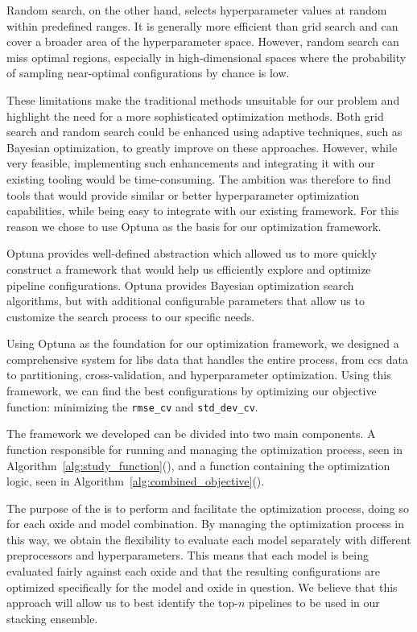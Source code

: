 Random search, on the other hand, selects hyperparameter values at random within predefined ranges. 
It is generally more efficient than grid search and can cover a broader area of the hyperparameter space. 
However, random search can miss optimal regions, especially in high-dimensional spaces where the probability of sampling near-optimal configurations by chance is low. 

These limitations make the traditional methods unsuitable for our problem and highlight the need for a more sophisticated optimization methods.
Both grid search and random search could be enhanced using adaptive techniques, such as Bayesian optimization, to greatly improve on these approaches.
However, while very feasible, implementing such enhancements and integrating it with our existing tooling would be time-consuming.
The ambition was therefore to find tools that would provide similar or better hyperparameter optimization capabilities, while being easy to integrate with our existing framework.
For this reason we chose to use Optuna as the basis for our optimization framework.

Optuna provides well-defined abstraction which allowed us to more quickly construct a framework that would help us efficiently explore and optimize pipeline configurations\cite{optuna_2019}.
Optuna provides Bayesian optimization search algorithms, but with additional configurable parameters that allow us to customize the search process to our specific needs.

Using Optuna as the foundation for our optimization framework, we designed a comprehensive system for \gls{libs} data that handles the entire process, from \gls{ccs} data to partitioning, cross-validation, and hyperparameter optimization.
Using this framework, we can find the best configurations by optimizing our objective function: minimizing the \texttt{rmse\_cv} and \texttt{std\_dev\_cv}.

The framework we developed can be divided into two main components.
A function responsible for running and managing the optimization process, seen in Algorithm~\ref{alg:study_function}(), and a function containing the optimization logic, seen in Algorithm~\ref{alg:combined_objective}().

The purpose of the  is to perform and facilitate the optimization process, doing so for each oxide and model combination.
By managing the optimization process in this way, we obtain the flexibility to evaluate each model separately with different preprocessors and hyperparameters.
This means that each model is being evaluated fairly against each oxide and that the resulting configurations are optimized specifically for the model and oxide in question.
We believe that this approach will allow us to best identify the top-$n$ pipelines to be used in our stacking ensemble.

